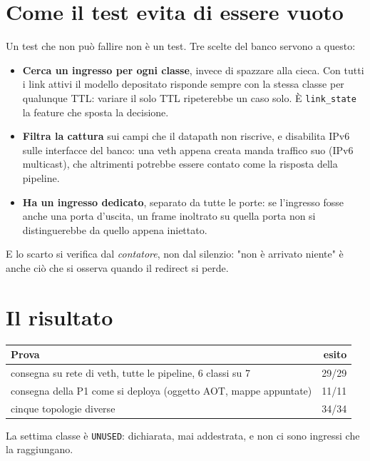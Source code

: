 \documentclass[11pt,a4paper,oneside]{report}
\begin{document}
\section{Come il test evita di essere vuoto}

Un test che non può fallire non è un test. Tre scelte del banco servono a
questo:

\begin{itemize}
  \item \textbf{Cerca un ingresso per ogni classe}, invece di spazzare alla
        cieca. Con tutti i link attivi il modello depositato risponde sempre con
        la stessa classe per qualunque TTL: variare il solo TTL ripeterebbe un
        caso solo. È \texttt{link\_state} la feature che sposta la decisione.
  \item \textbf{Filtra la cattura} sui campi che il datapath non riscrive, e
        disabilita IPv6 sulle interfacce del banco: una veth appena creata
        manda traffico suo (IPv6 multicast), che altrimenti potrebbe essere
        contato come la risposta della pipeline.
  \item \textbf{Ha un ingresso dedicato}, separato da tutte le porte: se
        l'ingresso fosse anche una porta d'uscita, un frame inoltrato su quella
        porta non si distinguerebbe da quello appena iniettato.
\end{itemize}

E lo scarto si verifica dal \emph{contatore}, non dal silenzio: "non è arrivato
niente" è anche ciò che si osserva quando il redirect si perde.

\section{Il risultato}

\begin{center}
\small
\begin{tabular}{@{}lr@{}}
\toprule
\textbf{Prova} & \textbf{esito} \\
\midrule
consegna su rete di veth, tutte le pipeline, 6 classi su 7 & 29/29 \\
consegna della P1 come si deploya (oggetto AOT, mappe appuntate) & 11/11 \\
cinque topologie diverse & 34/34 \\
\bottomrule
\end{tabular}
\end{center}

La settima classe è \texttt{UNUSED}: dichiarata, mai addestrata, e non ci sono
ingressi che la raggiungano.
\end{document}
